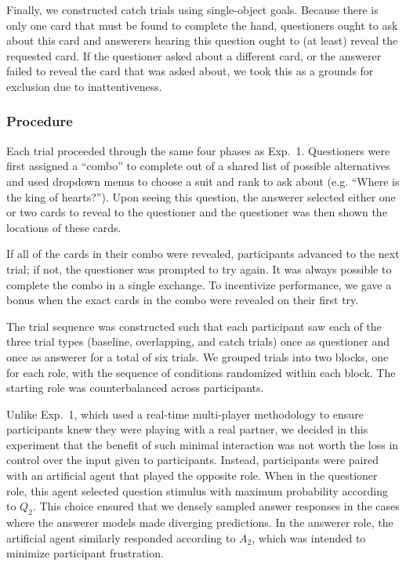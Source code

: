 \documentclass[11pt, floatsintext]{apa6}
\begin{document}
Finally, we constructed catch trials using single-object goals. 
Because there is only one card that must be found to complete the hand, questioners ought to ask about this card and answerers hearing this question ought to (at least) reveal the requested card.
If the questioner asked about a different card, or the answerer failed to reveal the card that was asked about, we took this as a grounds for exclusion due to inattentiveness.

\subsubsection{Procedure}

Each trial proceeded through the same four phases as Exp.~1. 
Questioners were first assigned a ``combo'' to complete out of a shared list of possible alternatives and used dropdown menus to choose a suit and rank to ask about (e.g. ``Where is the king of hearts?'').
Upon seeing this question, the answerer selected either one or two cards to reveal to the questioner and the questioner was then shown the locations of these cards.

If all of the cards in their combo were revealed, participants advanced to the next trial; if not, the questioner was prompted to try again.
It was always possible to complete the combo in a single exchange.
To incentivize performance, we gave a bonus when the exact cards in the combo were revealed on their first try. 

The trial sequence was constructed such that each participant saw each of the three trial types (baseline, overlapping, and catch trials) once as questioner and once as answerer for a total of six trials.
We grouped trials into two blocks, one for each role, with the sequence of conditions randomized within each block.
The starting role was counterbalanced across participants.

Unlike Exp.~1, which used a real-time multi-player methodology to ensure participants knew they were playing with a real partner, we decided in this experiment that the benefit of such minimal interaction was not worth the loss in control over the input given to participants.
Instead, participants were paired with an artificial agent that played the opposite role.
When in the questioner role, this agent selected question stimulus with maximum probability according to $Q_2$. 
This choice ensured that we densely sampled answer responses in the cases where the answerer models made diverging predictions.
In the answerer role, the artificial agent similarly responded according to $A_2$, which was intended to minimize participant frustration.
\end{document}
